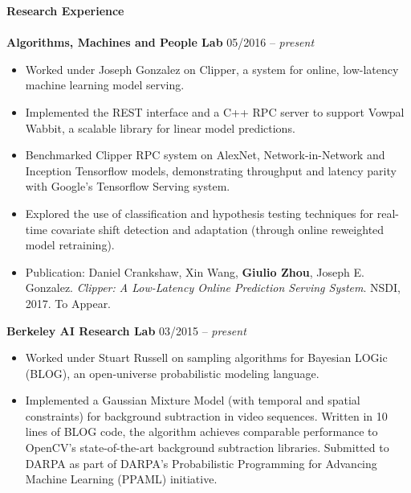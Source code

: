 \documentclass{article}
\begin{document}
\noindent
\textbf{{\Large Research Experience}}\\[-2mm]
\HRule\\
\noindent
\textbf{Algorithms, Machines and People Lab}
\hfill 05/2016 -- \textit{present}
\begin{itemize}
\vspace{-2.5mm}
\item Worked under Joseph Gonzalez on Clipper, a system for online, low-latency machine learning model serving.
\vspace{-2.5mm}
\item Implemented the REST interface and a C++ RPC server to support Vowpal Wabbit, a scalable library for linear model predictions.
\vspace{-2.5mm}
\item Benchmarked Clipper RPC system on AlexNet, Network-in-Network and Inception Tensorflow models, demonstrating throughput and latency parity with Google's Tensorflow Serving system.
\vspace{-2.5mm}
\item Explored the use of classification and hypothesis testing techniques for real-time covariate shift detection and adaptation (through online reweighted model retraining).
\vspace{-2.5mm}
\item Publication: Daniel Crankshaw, Xin Wang, \textbf{Giulio Zhou}, Joseph E. Gonzalez. \textit{Clipper: A Low-Latency Online Prediction Serving System}. NSDI, 2017. To Appear.
\end{itemize}
\vspace{-2mm}

\noindent
\textbf{Berkeley AI Research Lab}
\hfill 03/2015 -- \textit{present}
\begin{itemize}
\vspace{-2.5mm}
\item Worked under Stuart Russell on sampling algorithms for Bayesian LOGic (BLOG), an open-universe probabilistic modeling language.
\vspace{-2.5mm}
\item Implemented a Gaussian Mixture Model (with temporal and spatial constraints) for background subtraction in video sequences. Written in 10 lines of BLOG code, the algorithm achieves comparable performance to OpenCV's state-of-the-art background subtraction libraries. Submitted to DARPA as part of DARPA's Probabilistic Programming for Advancing Machine Learning (PPAML) initiative.
\end{itemize}
\end{document}
